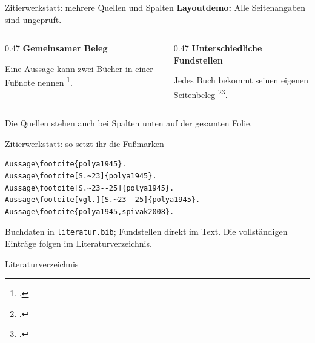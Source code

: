\documentclass[aspectratio=169,11pt]{beamer}
\begin{document}
\begin{frame}{Zitierwerkstatt: mehrere Quellen und Spalten}
  \small\textbf{Layoutdemo:} Alle Seitenangaben sind ungeprüft.
  \medskip
  \begin{columns}[T,onlytextwidth]
    \begin{column}{0.47\textwidth}
      \textbf{Gemeinsamer Beleg}
      \par\medskip
      Eine Aussage kann zwei Bücher in einer Fußnote nennen%
      \footcite{polya1945,spivak2008}.
    \end{column}
    \begin{column}{0.47\textwidth}
      \textbf{Unterschiedliche Fundstellen}
      \par\medskip
      Jedes Buch bekommt seinen eigenen Seitenbeleg%
      \footcite[S.~23]{polya1945}\footcite[S.~10--12]{spivak2008}.
    \end{column}
  \end{columns}
  \medskip
  \small Die Quellen stehen auch bei Spalten unten auf der gesamten Folie.
\end{frame}

\begin{frame}[fragile]{Zitierwerkstatt: so setzt ihr die Fußmarken}
  \begin{verbatim}
Aussage\footcite{polya1945}.
Aussage\footcite[S.~23]{polya1945}.
Aussage\footcite[S.~23--25]{polya1945}.
Aussage\footcite[vgl.][S.~23--25]{polya1945}.
Aussage\footcite{polya1945,spivak2008}.
  \end{verbatim}
  \small Buchdaten in \texttt{literatur.bib}; Fundstellen direkt im Text.
  Die vollständigen Einträge folgen im Literaturverzeichnis.
\end{frame}

\begin{frame}[allowframebreaks]{Literaturverzeichnis}
  \footnotesize
  
  
\end{frame}

\end{document}
